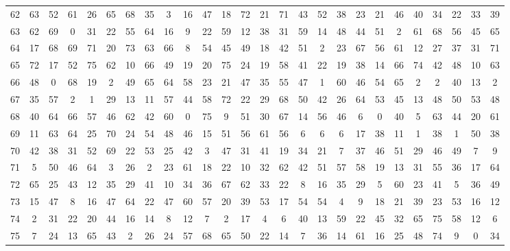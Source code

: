 \begin{table}
\begin{tabular}{c c c c c c c c c c c c c c c c c c c c c c c c c c }
62 & 63 & 52 & 61 & 26 & 65 & 68 & 35 & 3 & 16 & 47 & 18 & 72 & 21 & 71 & 43 & 52 & 38 & 23 & 21 & 46 & 40 & 34 & 22 & 33 & 39 \\
63 & 62 & 69 & 0 & 31 & 22 & 55 & 64 & 16 & 9 & 22 & 59 & 12 & 38 & 31 & 59 & 14 & 48 & 44 & 51 & 2 & 61 & 68 & 56 & 45 & 65 \\
64 & 17 & 68 & 69 & 71 & 20 & 73 & 63 & 66 & 8 & 54 & 45 & 49 & 18 & 42 & 51 & 2 & 23 & 67 & 56 & 61 & 12 & 27 & 37 & 31 & 71 \\
65 & 72 & 17 & 52 & 75 & 62 & 10 & 66 & 49 & 19 & 20 & 75 & 24 & 19 & 58 & 41 & 22 & 19 & 38 & 14 & 66 & 74 & 42 & 48 & 10 & 63 \\
66 & 48 & 0 & 68 & 19 & 2 & 49 & 65 & 64 & 58 & 23 & 21 & 47 & 35 & 55 & 47 & 1 & 60 & 46 & 54 & 65 & 2 & 2 & 40 & 13 & 2 \\
67 & 35 & 57 & 2 & 1 & 29 & 13 & 11 & 57 & 44 & 58 & 72 & 22 & 29 & 68 & 50 & 42 & 26 & 64 & 53 & 45 & 13 & 48 & 50 & 53 & 48 \\
68 & 40 & 64 & 66 & 57 & 46 & 62 & 42 & 60 & 0 & 75 & 9 & 51 & 30 & 67 & 14 & 56 & 46 & 6 & 0 & 40 & 5 & 63 & 44 & 20 & 61 \\
69 & 11 & 63 & 64 & 25 & 70 & 24 & 54 & 48 & 46 & 15 & 51 & 56 & 61 & 56 & 6 & 6 & 6 & 17 & 38 & 11 & 1 & 38 & 1 & 50 & 38 \\
70 & 42 & 38 & 31 & 52 & 69 & 22 & 53 & 25 & 42 & 3 & 47 & 31 & 41 & 19 & 34 & 21 & 7 & 37 & 46 & 51 & 29 & 46 & 49 & 7 & 9 \\
71 & 5 & 50 & 46 & 64 & 3 & 26 & 2 & 23 & 61 & 18 & 22 & 10 & 32 & 62 & 42 & 51 & 57 & 58 & 19 & 13 & 31 & 55 & 36 & 17 & 64 \\
72 & 65 & 25 & 43 & 12 & 35 & 29 & 41 & 10 & 34 & 36 & 67 & 62 & 33 & 22 & 8 & 16 & 35 & 29 & 5 & 60 & 23 & 41 & 5 & 36 & 49 \\
73 & 15 & 47 & 8 & 16 & 47 & 64 & 22 & 47 & 60 & 57 & 20 & 39 & 53 & 17 & 54 & 54 & 4 & 9 & 18 & 21 & 39 & 23 & 53 & 16 & 12 \\
74 & 2 & 31 & 22 & 20 & 44 & 16 & 14 & 8 & 12 & 7 & 2 & 17 & 4 & 6 & 40 & 13 & 59 & 22 & 45 & 32 & 65 & 75 & 58 & 12 & 6 \\
75 & 7 & 24 & 13 & 65 & 43 & 2 & 26 & 24 & 57 & 68 & 65 & 50 & 22 & 14 & 7 & 36 & 14 & 61 & 16 & 25 & 48 & 74 & 9 & 0 & 34 \\
\hline
\end{tabular}
\end{table}